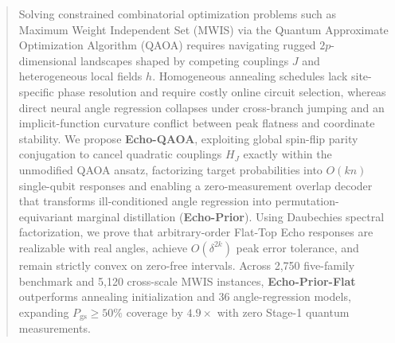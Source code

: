 \documentclass{article}
\theoremstyle{plain}
\theoremstyle{definition}
\begin{document}

\printAffiliationsAndNotice{}


\begin{abstract}

Solving constrained combinatorial optimization problems such as Maximum Weight Independent Set (MWIS) via the Quantum Approximate Optimization Algorithm (QAOA) requires navigating rugged $2p$-dimensional landscapes shaped by competing couplings $J$ and heterogeneous local fields $h$. Homogeneous annealing schedules lack site-specific phase resolution and require costly online circuit selection, whereas direct neural angle regression collapses under cross-branch jumping and an implicit-function curvature conflict between peak flatness and coordinate stability. We propose \textbf{Echo-QAOA}, exploiting global spin-flip parity conjugation to cancel quadratic couplings $H_J$ exactly within the unmodified QAOA ansatz, factorizing target probabilities into $O(kn)$ single-qubit responses and enabling a zero-measurement overlap decoder that transforms ill-conditioned angle regression into permutation-equivariant marginal distillation (\textbf{Echo-Prior}). Using Daubechies spectral factorization, we prove that arbitrary-order Flat-Top Echo responses are realizable with real angles, achieve $O(\delta^{2k})$ peak error tolerance, and remain strictly convex on zero-free intervals. Across 2,750 five-family benchmark and 5,120 cross-scale MWIS instances, \textbf{Echo-Prior-Flat} outperforms annealing initialization and 36 angle-regression models, expanding $P_{\mathrm{gs}}\ge 50\%$ coverage by $4.9\times$ with zero Stage-1 quantum measurements.

\end{abstract}
\end{document}
